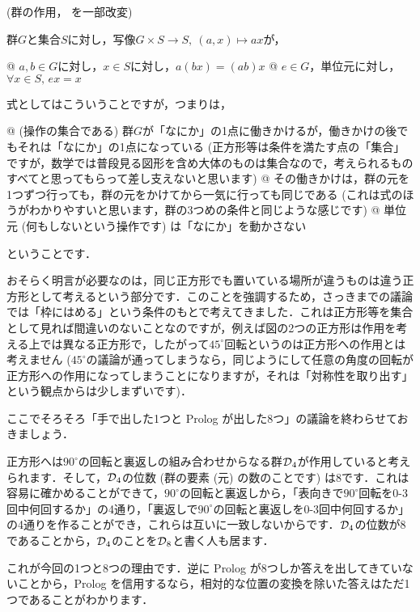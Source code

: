 \documentclass[11pt]{jsarticle}
\begin{document}
\begin{defi}(群の作用，\cite[p. 33]{katura} を一部改変)

  群$G$と集合$S$に対し，写像$G\times S\to S,\ (a,x)\mapsto ax $が，
  \begin{easylist}[enumerate]
    @ $a,b\in G$に対し，$x\in S$に対し，$a(bx) = (ab)x $
    @ $e\in G$，単位元に対し，$\forall x\in S,\, ex = x$
  \end{easylist}
\end{defi}

式としてはこういうことですが，つまりは，
\begin{easylist}[enumerate]
  @ (操作の集合である) 群$G$が「なにか」の1点に働きかけるが，働きかけの後でもそれは「なにか」の1点になっている (正方形等は条件を満たす点の「集合」ですが，数学では普段見る図形を含め大体のものは集合なので，考えられるものすべてと思ってもらって差し支えないと思います)
  @ その働きかけは，群の元を1つずつ行っても，群の元をかけてから一気に行っても同じである (これは式のほうがわかりやすいと思います，群の3つめの条件と同じような感じです)
  @ 単位元 (何もしないという操作です) は「なにか」を動かさない
\end{easylist}
ということです．

おそらく明言が必要なのは，同じ正方形でも置いている場所が違うものは違う正方形として考えるという部分です．このことを強調するため，さっきまでの議論では「枠にはめる」という条件のもとで考えてきました．これは正方形等を集合として見れば間違いのないことなのですが，例えば図の2つの正方形は作用を考える上では異なる正方形で，したがって$45^\circ$回転というのは正方形への作用とは考えません ($45^\circ $の議論が通ってしまうなら，同じようにして任意の角度の回転が正方形への作用になってしまうことになりますが，それは「対称性を取り出す」という観点からは少しまずいです)．

ここでそろそろ「手で出した1つと Prolog が出した8つ」の議論を終わらせておきましょう．

正方形へは$90^\circ$の回転と裏返しの組み合わせからなる群$\operatorname{\mathcal{D}}_4$が作用していると考えられます．そして，$\operatorname{\mathcal{D}}_4$の位数 (群の要素 (元) の数のことです) は8です．これは容易に確かめることができて，$90^\circ$の回転と裏返しから，「表向きで$90^\circ$回転を0-3回中何回するか」の4通り，「裏返しで$90^\circ$の回転と裏返しを0-3回中何回するか」の4通りを作ることができ，これらは互いに一致しないからです．$\operatorname{\mathcal{D}}_4$の位数が8であることから，$\operatorname{\mathcal{D}}_4$のことを$\operatorname{\mathcal{D}}_8$と書く人も居ます．

これが今回の1つと8つの理由です．逆に Prolog が8つしか答えを出してきていないことから，Prolog を信用するなら，相対的な位置の変換を除いた答えはただ1つであることがわかります．
\end{document}
